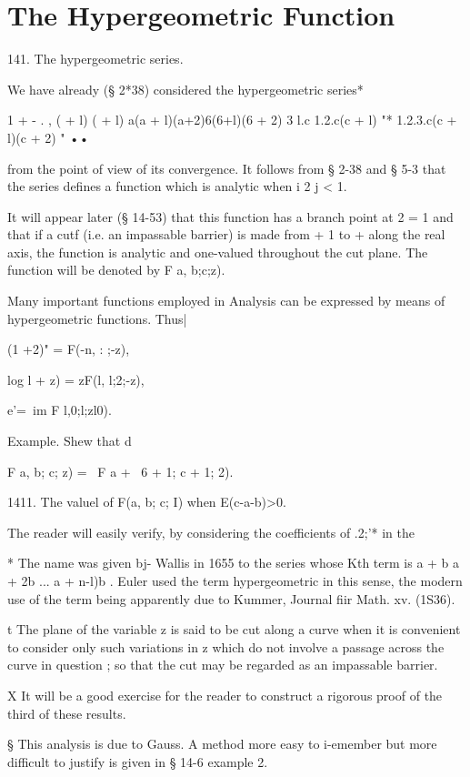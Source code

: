 \chapter{The Hypergeometric Function} 

141. The hypergeometric series.

We have already (§ 2*38) considered the hypergeometric series*

1 + - . , ( + l) ( + l) a(a + l)(a+2)6(6+l)(6 + 2) 3 l.c 1.2.c(c + l)
"* 1.2.3.c(c + l)(c + 2) " ••

from the point of view of its convergence. It follows from § 2-38 and
§ 5-3 that the series defines a function which is analytic when i 2 j
< 1.

It will appear later (§ 14-53) that this function has a branch point
at 2 = 1 and that if a cutf (i.e. an impassable barrier) is made from
+ 1 to + along the real axis, the function is analytic and one-valued
throughout the cut plane. The function will be denoted by F a, b;c;z).

Many important functions employed in Analysis can be expressed by
means of hypergeometric functions. Thus|

(1 +2)" = F(-n, : ;-z),

log l + z) = zF(l, l;2;-z),

e'=\ im F l,0;l;zl0).

Example. Shew that d

F a, b; c; z) = ~F a + \, 6 + 1; c + 1; 2).

1411. The valuel of F(a, b; c; I) when E(c-a-b)>0.

The reader will easily verify, by considering the coefficients of
.2;'* in the

* The name was given bj- Wallis in 1655 to the series whose Kth term
is a + b a + 2b ... a + n-l)b . Euler used the term hypergeometric in
this sense, the modern use of the term being apparently due to Kummer,
Journal fiir Math. xv. (1S36).

t The plane of the variable z is said to be cut along a curve when it
is convenient to consider only such variations in z which do not
involve a passage across the curve in question ; so that the cut may
be regarded as an impassable barrier.

X It will be a good exercise for the reader to construct a rigorous
proof of the third of these results.

§ This analysis is due to Gauss. A method more easy to i-emember but
more difficult to justify is given in § 14-6 example 2.

